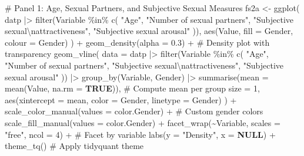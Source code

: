 \documentclass[
  bookmarksnumbered]{article}
\newenvironment{Shaded}{\begin{snugshade}}{\end{snugshade}}
\newcommand{\AttributeTok}[1]{\textcolor[rgb]{0.80,0.80,0.80}{#1}}
\newcommand{\CommentTok}[1]{\textcolor[rgb]{0.50,0.62,0.50}{#1}}
\newcommand{\ConstantTok}[1]{\textcolor[rgb]{0.86,0.64,0.64}{\textbf{#1}}}
\newcommand{\DecValTok}[1]{\textcolor[rgb]{0.86,0.86,0.80}{#1}}
\newcommand{\FloatTok}[1]{\textcolor[rgb]{0.75,0.75,0.82}{#1}}
\newcommand{\FunctionTok}[1]{\textcolor[rgb]{0.94,0.94,0.56}{#1}}
\newcommand{\NormalTok}[1]{\textcolor[rgb]{0.80,0.80,0.80}{#1}}
\newcommand{\OtherTok}[1]{\textcolor[rgb]{0.94,0.94,0.56}{#1}}
\newcommand{\SpecialCharTok}[1]{\textcolor[rgb]{0.86,0.64,0.64}{#1}}
\newcommand{\StringTok}[1]{\textcolor[rgb]{0.80,0.58,0.58}{#1}}
\begin{document}
\begin{Shaded}
\begin{Highlighting}[]
\CommentTok{\# Panel 1: Age, Sexual Partners, and Subjective Sexual Measures}
\NormalTok{fs2a }\OtherTok{\textless{}{-}} \FunctionTok{ggplot}\NormalTok{(}
\NormalTok{  datp }\SpecialCharTok{|\textgreater{}} \FunctionTok{filter}\NormalTok{(Variable }\SpecialCharTok{\%in\%} \FunctionTok{c}\NormalTok{(}
    \StringTok{"Age"}\NormalTok{, }\StringTok{"Number of sexual partners"}\NormalTok{,}
    \StringTok{"Subjective sexual}\SpecialCharTok{\textbackslash{}n}\StringTok{attractiveness"}\NormalTok{, }\StringTok{"Subjective sexual arousal"}
\NormalTok{  )),}
  \FunctionTok{aes}\NormalTok{(Value, }\AttributeTok{fill =}\NormalTok{ Gender, }\AttributeTok{colour =}\NormalTok{ Gender)}
\NormalTok{) }\SpecialCharTok{+}
  \FunctionTok{geom\_density}\NormalTok{(}\AttributeTok{alpha =} \FloatTok{0.3}\NormalTok{) }\SpecialCharTok{+} \CommentTok{\# Density plot with transparency}
  \FunctionTok{geom\_vline}\NormalTok{(}
    \AttributeTok{data =}\NormalTok{ datp }\SpecialCharTok{|\textgreater{}}
      \FunctionTok{filter}\NormalTok{(Variable }\SpecialCharTok{\%in\%} \FunctionTok{c}\NormalTok{(}
        \StringTok{"Age"}\NormalTok{, }\StringTok{"Number of sexual partners"}\NormalTok{,}
        \StringTok{"Subjective sexual}\SpecialCharTok{\textbackslash{}n}\StringTok{attractiveness"}\NormalTok{, }\StringTok{"Subjective sexual arousal"}
\NormalTok{      )) }\SpecialCharTok{|\textgreater{}}
      \FunctionTok{group\_by}\NormalTok{(Variable, Gender) }\SpecialCharTok{|\textgreater{}}
      \FunctionTok{summarise}\NormalTok{(}\AttributeTok{mean =} \FunctionTok{mean}\NormalTok{(Value, }\AttributeTok{na.rm =} \ConstantTok{TRUE}\NormalTok{)), }\CommentTok{\# Compute mean per group}
    \AttributeTok{size =} \DecValTok{1}\NormalTok{, }\FunctionTok{aes}\NormalTok{(}\AttributeTok{xintercept =}\NormalTok{ mean, }\AttributeTok{color =}\NormalTok{ Gender, }\AttributeTok{linetype =}\NormalTok{ Gender)}
\NormalTok{  ) }\SpecialCharTok{+}
  \FunctionTok{scale\_color\_manual}\NormalTok{(}\AttributeTok{values =}\NormalTok{ color.Gender) }\SpecialCharTok{+} \CommentTok{\# Custom gender colors}
  \FunctionTok{scale\_fill\_manual}\NormalTok{(}\AttributeTok{values =}\NormalTok{ color.Gender) }\SpecialCharTok{+}
  \FunctionTok{facet\_wrap}\NormalTok{(}\SpecialCharTok{\textasciitilde{}}\NormalTok{Variable, }\AttributeTok{scales =} \StringTok{"free"}\NormalTok{, }\AttributeTok{ncol =} \DecValTok{4}\NormalTok{) }\SpecialCharTok{+} \CommentTok{\# Facet by variable}
  \FunctionTok{labs}\NormalTok{(}\AttributeTok{y =} \StringTok{"Density"}\NormalTok{, }\AttributeTok{x =} \ConstantTok{NULL}\NormalTok{) }\SpecialCharTok{+}
  \FunctionTok{theme\_tq}\NormalTok{() }\CommentTok{\# Apply tidyquant theme}


\end{Highlighting}
\end{Shaded}
\end{document}

